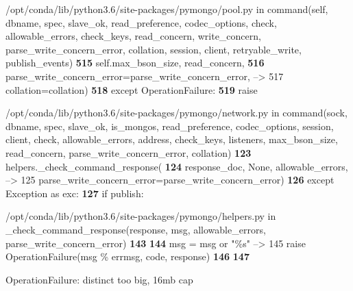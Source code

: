 \documentclass[letterpaper,10pt,english]{sphinxmanual}
\begin{document}
\begin{OriginalVerbatim}[commandchars=\\\{\}]
\textcolor{ansi-green}{/opt/conda/lib/python3.6/site-packages/pymongo/pool.py} in \textcolor{ansi-cyan}{command}\textcolor{ansi-blue}{(self, dbname, spec, slave\_ok, read\_preference, codec\_options, check, allowable\_errors, check\_keys, read\_concern, write\_concern, parse\_write\_concern\_error, collation, session, client, retryable\_write, publish\_events)}
\textcolor{ansi-green-intense}{\textbf{    515}}                            self\textcolor{ansi-blue}{.}max\_bson\_size\textcolor{ansi-blue}{,} read\_concern\textcolor{ansi-blue}{,}
\textcolor{ansi-green-intense}{\textbf{    516}}                            parse\_write\_concern\_error\textcolor{ansi-blue}{=}parse\_write\_concern\_error\textcolor{ansi-blue}{,}
\textcolor{ansi-green}{--> 517}\textcolor{ansi-red}{                            collation=collation)
}\textcolor{ansi-green-intense}{\textbf{    518}}         \textcolor{ansi-green}{except} OperationFailure\textcolor{ansi-blue}{:}
\textcolor{ansi-green-intense}{\textbf{    519}}             \textcolor{ansi-green}{raise}

\textcolor{ansi-green}{/opt/conda/lib/python3.6/site-packages/pymongo/network.py} in \textcolor{ansi-cyan}{command}\textcolor{ansi-blue}{(sock, dbname, spec, slave\_ok, is\_mongos, read\_preference, codec\_options, session, client, check, allowable\_errors, address, check\_keys, listeners, max\_bson\_size, read\_concern, parse\_write\_concern\_error, collation)}
\textcolor{ansi-green-intense}{\textbf{    123}}             helpers.\_check\_command\_response(
\textcolor{ansi-green-intense}{\textbf{    124}}                 response\_doc\textcolor{ansi-blue}{,} \textcolor{ansi-green}{None}\textcolor{ansi-blue}{,} allowable\_errors\textcolor{ansi-blue}{,}
\textcolor{ansi-green}{--> 125}\textcolor{ansi-red}{                 parse\_write\_concern\_error=parse\_write\_concern\_error)
}\textcolor{ansi-green-intense}{\textbf{    126}}     \textcolor{ansi-green}{except} Exception \textcolor{ansi-green}{as} exc\textcolor{ansi-blue}{:}
\textcolor{ansi-green-intense}{\textbf{    127}}         \textcolor{ansi-green}{if} publish\textcolor{ansi-blue}{:}

\textcolor{ansi-green}{/opt/conda/lib/python3.6/site-packages/pymongo/helpers.py} in \textcolor{ansi-cyan}{\_check\_command\_response}\textcolor{ansi-blue}{(response, msg, allowable\_errors, parse\_write\_concern\_error)}
\textcolor{ansi-green-intense}{\textbf{    143}}
\textcolor{ansi-green-intense}{\textbf{    144}}             msg \textcolor{ansi-blue}{=} msg \textcolor{ansi-green}{or} \textcolor{ansi-blue}{"\%s"}
\textcolor{ansi-green}{--> 145}\textcolor{ansi-red}{             }\textcolor{ansi-green}{raise} OperationFailure\textcolor{ansi-blue}{(}msg \textcolor{ansi-blue}{\%} errmsg\textcolor{ansi-blue}{,} code\textcolor{ansi-blue}{,} response\textcolor{ansi-blue}{)}
\textcolor{ansi-green-intense}{\textbf{    146}}
\textcolor{ansi-green-intense}{\textbf{    147}}

\textcolor{ansi-red}{OperationFailure}: distinct too big, 16mb cap
\end{OriginalVerbatim}
\end{document}

